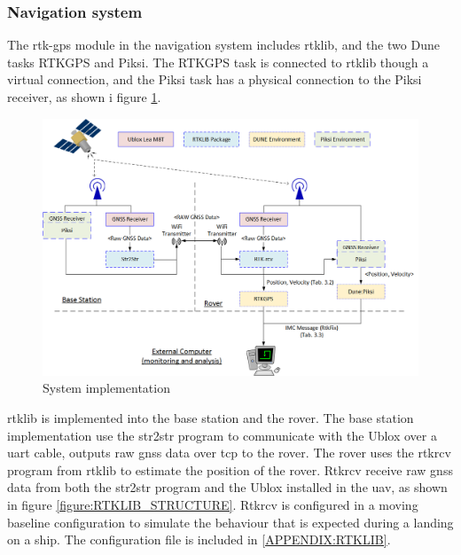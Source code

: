 \subsubsection{Navigation system}
The \gls{rtk-gps} module in the navigation system includes \gls{rtklib}, and the two Dune tasks RTKGPS and Piksi. The RTKGPS task is connected to \gls{rtklib} though a virtual connection, and the Piksi task has a physical connection to the Piksi receiver, as shown i figure \ref{figure:HardSoft}.
\begin{figure}[H]
	\centering
		\includegraphics[width=1\textwidth]{figs/Combined.png}
		\caption{System implementation}
		\label{figure:HardSoft}
\end{figure}

\gls{rtklib} is implemented into the base station and the rover. The base station implementation use the  str2str program to communicate with the Ublox over a uart cable, outputs raw \gls{gnss} data over tcp to the rover.
The rover uses the rtkrcv program from \gls{rtklib} to estimate the position of the rover. Rtkrcv receive raw \gls{gnss} data from both the str2str program and the Ublox installed in the \gls{uav}, as shown in figure \ref{figure:RTKLIB_STRUCTURE}. Rtkrcv is configured in a moving baseline configuration to simulate the behaviour that is expected during a landing on a ship. The configuration file is included in \ref{APPENDIX:RTKLIB}.

